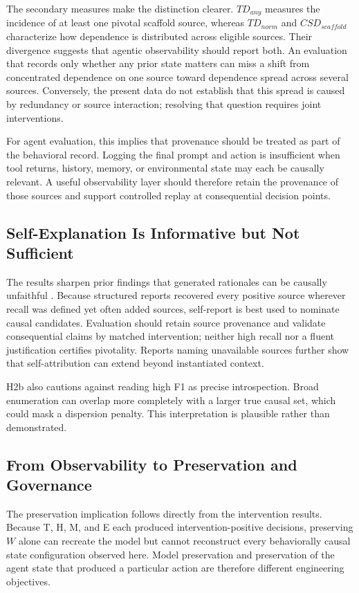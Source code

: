 \documentclass[conference]{IEEEtran}
\begin{document}
The secondary measures make the distinction clearer. $TD_{any}$ measures the incidence of at least one pivotal scaffold source, whereas $TD_{norm}$ and $CSD_{scaffold}$ characterize how dependence is distributed across eligible sources. Their divergence suggests that agentic observability should report both. An evaluation that records only whether any prior state matters can miss a shift from concentrated dependence on one source toward dependence spread across several sources. Conversely, the present data do not establish that this spread is caused by redundancy or source interaction; resolving that question requires joint interventions.

For agent evaluation, this implies that provenance should be treated as part of the behavioral record. Logging the final prompt and action is insufficient when tool returns, history, memory, or environmental state may each be causally relevant. A useful observability layer should therefore retain the provenance of those sources and support controlled replay at consequential decision points.

\subsection{Self-Explanation Is Informative but Not Sufficient}
The results sharpen prior findings that generated rationales can be causally unfaithful \cite{b8,b9,b13,b14}. Because structured reports recovered every positive source wherever recall was defined yet often added sources, self-report is best used to nominate causal candidates. Evaluation should retain source provenance and validate consequential claims by matched intervention; neither high recall nor a fluent justification certifies pivotality. Reports naming unavailable sources further show that self-attribution can extend beyond instantiated context.

H2b also cautions against reading high F1 as precise introspection. Broad enumeration can overlap more completely with a larger true causal set, which could mask a dispersion penalty. This interpretation is plausible rather than demonstrated.

\subsection{From Observability to Preservation and Governance}
The preservation implication follows directly from the intervention results. Because T, H, M, and E each produced intervention-positive decisions, preserving $W$ alone can recreate the model but cannot reconstruct every behaviorally causal state configuration observed here. Model preservation and preservation of the agent state that produced a particular action are therefore different engineering objectives.
\end{document}
